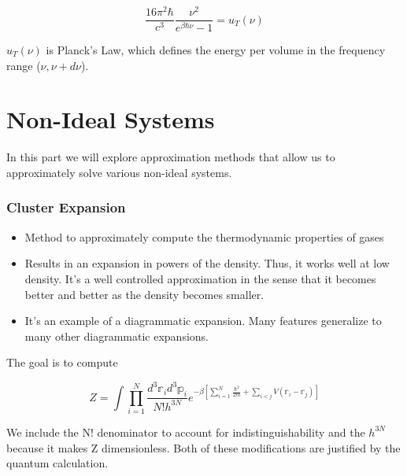 \documentclass{article}
\newcommand{\sumser}[2]{\sum\limits_{#1}^{#2}}
\newcommand{\qmom}{\frac{\hbar^{2}}{2m}}
\newcommand{\mbb}[1]{\mathbb{#1}}
\begin{document}
$$\frac{16\pi^{2}\hbar}{c^{3}}\frac{\nu^{2}}{e^{\beta\hbar\nu}-1}=u_{T}(\nu)$$

$u_{T}(\nu)$ is Planck's Law, which defines the energy per volume in the frequency range ($\nu,\nu+d\nu$).

\part{Non-Ideal Systems}

In this part we will explore approximation methods that allow us to approximately solve various non-ideal systems.

\section{Cluster Expansion}

\begin{itemize}
	\item Method to approximately compute the thermodynamic properties of gases
	\item Results in an expansion in powers of the density.  Thus, it works well at low density.  It's a well controlled approximation in the sense that it becomes better and better as the density becomes smaller.
	\item It's an example of a diagrammatic expansion.  Many features generalize to many other diagrammatic expansions.
\end{itemize}

The goal is to compute 

$$Z=\int\prod_{i=1}^{N}\frac{d^{3}\mbb{r}_{i}d^{3}\mbb{p}_{i}}{N!h^{3N}}e^{-\beta[\sumser{i=1}{N}\qmom+\sum_{i<j}V(\mbb{r}_{i}-\mbb{r}_{j})]}$$

We include the N! denominator to account for indistinguishability and the $h^{3N}$ because it makes Z dimensionless.  Both of these modifications are justified by the quantum calculation.

 
\end{document}
